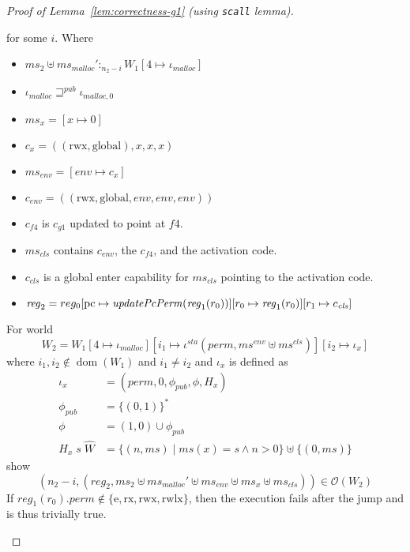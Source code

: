\documentclass[a4paper]{article}
\newcommand{\update}[2]{[#1 \mapsto #2]}
\newcommand{\union}{\mathbin{\cup}}
\DeclareMathOperator{\dom}{dom}
\newcommand{\var}[1]{\mathit{#1}}
\newcommand{\hs}{\var{ms}}
\newcommand{\ms}{\hs}
\newcommand{\pcreg}{\mathrm{pc}}
\newcommand{\reg}{\var{reg}}
\newcommand{\heap}{\var{mem}}
\newcommand{\perm}{\var{perm}}
\newcommand{\sta}{\var{sta}}
\newcommand{\env}{\var{env}}
\newcommand{\cls}{\var{cls}}
\newcommand{\plainfun}[2]{
  \ifthenelse{\equal{#2}{}}
  {\mathit{#1}}
  {\mathit{#1}(#2)}
}
\newcommand{\updatePcPerm}[1]{\plainfun{updatePcPerm}{#1}}
\newcommand{\pub}{\var{pub}}
\newcommand{\futurewk}{\mathbin{\sqsupseteq}^{\var{pub}}}
\newcommand{\heapSat}[3][\heap]{#1 :_{#2} #3}
\newcommand{\memSat}[3][n]{\heapSat[#2]{#1}{#3}}
\newcommand{\codelabel}[1]{\mathit{#1}}
\newcommand{\malloc}{\codelabel{malloc}}
\newcommand{\observations}{\mathcal{O}}
\newcommand{\npair}[2][n]{\left(#1,#2 \right)}
\newcommand{\plainperm}[1]{\mathrm{#1}}
\newcommand{\exec}{\plainperm{rx}}
\newcommand{\entry}{\plainperm{e}}
\newcommand{\rwx}{\plainperm{rwx}}
\newcommand{\rwlx}{\plainperm{rwlx}}
\newcommand{\glob}{\plainperm{global}}
\begin{document}
\begin{proof}[Proof of Lemma~\ref{lem:correctness-g1} (using \texttt{scall} lemma)]
\begin{enumproof}[resume]
\begin{enumproof}
\[          \]
          for some $i$. Where
          \begin{itemize}
          \item $\memSat[n_2-i]{\ms_2 \uplus \ms_\malloc'}{W_1\update{4}{\iota_\malloc}} $
          \item $\iota_\malloc \futurewk \iota_{\malloc,0}$
          \item $\ms_x = [x \mapsto 0]$
          \item $c_x = ((\rwx,\glob),x,x,x)$
          \item $\ms_\env = [\env \mapsto c_x]$
          \item $c_\env = ((\rwx,\glob,\env,\env,\env))$
          \item $c_{f4}$ is $c_{g1}$ updated to point at $f4$.
          \item $\ms_\cls$ contains $c_\env$, the $c_{f4}$, and the activation code.
          \item $c_\cls$ is a global enter capability for $\ms_\cls$ pointing to the activation code.
          \item $\reg_2 = reg_0\update{\pcreg}{\updatePcPerm{\reg_1(r_0)}}\update{r_0}{\reg_1(r_0)}\update{r_1}{c_\cls}$
          \end{itemize}
          For world
          \[
            W_2 = W_1\update{4}{\iota_\malloc}\update{i_1}{\iota^\sta (\perm,\ms^\env \uplus \ms^\cls)}\update{i_2}{\iota_x}
          \]
          where $i_1,i_2\not\in\dom(W_1)$ and $i_1 \neq i_2$ and $\iota_x$ is defined as
          \begin{align*}
            \iota_x   & = (\perm, 0, \phi_\pub, \phi, H_x) \\
            \phi_\pub & = \{(0,1)\}^* \\
            \phi      & = (1,0) \union \phi_\pub \\
            H_x \; s \; \hat{W} & = \{\npair{\ms} \mid \ms(x) = s \land n > 0 \} \uplus \{\npair[0]{\ms}\}
          \end{align*}
          show
          \begin{equation}
            \label{eq:g1-obs-to-show}
            \npair[n_2-i]{(\reg_2,\ms_2 \uplus \ms_\malloc' \uplus \ms_\env \uplus \ms_x \uplus \ms_\cls)} \in \observations(W_2)
          \end{equation}
          If $\reg_1(r_0).\perm \not\in \{\entry, \exec, \rwx, \rwlx\}$, then the execution fails after the jump and \label{eq:g1-obs-to-show} is thus trivially true.


\end{enumproof}
\end{enumproof}
\end{proof}
\end{document}
